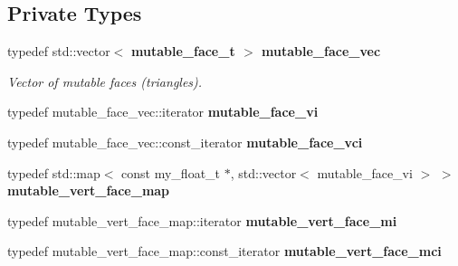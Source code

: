 \subsection*{Private Types}
\begin{CompactItemize}
\item 
typedef std::vector$<$ \bf{mutable\_\-face\_\-t} $>$ \bf{mutable\_\-face\_\-vec}\label{classSimSite3D_1_1geometry_1_1SimpleTrimeshTwo_820d124a6a7b91ebcec829990f741e39}

\begin{CompactList}\small\item\em Vector of mutable faces (triangles). \item\end{CompactList}\item 
typedef mutable\_\-face\_\-vec::iterator \textbf{mutable\_\-face\_\-vi}\label{classSimSite3D_1_1geometry_1_1SimpleTrimeshTwo_67e69e3a888c0c160c3f6ce71a68244d}

\item 
typedef mutable\_\-face\_\-vec::const\_\-iterator \textbf{mutable\_\-face\_\-vci}\label{classSimSite3D_1_1geometry_1_1SimpleTrimeshTwo_3940973197f37f724d808e3d50a24058}

\item 
typedef std::map$<$ const my\_\-float\_\-t $\ast$, std::vector$<$ mutable\_\-face\_\-vi $>$ $>$ \textbf{mutable\_\-vert\_\-face\_\-map}\label{classSimSite3D_1_1geometry_1_1SimpleTrimeshTwo_27881edcabffbac65061128ca312d097}

\item 
typedef mutable\_\-vert\_\-face\_\-map::iterator \textbf{mutable\_\-vert\_\-face\_\-mi}\label{classSimSite3D_1_1geometry_1_1SimpleTrimeshTwo_0d3a0a32929910b60583da6bd9445f85}

\item 
typedef mutable\_\-vert\_\-face\_\-map::const\_\-iterator \textbf{mutable\_\-vert\_\-face\_\-mci}\label{classSimSite3D_1_1geometry_1_1SimpleTrimeshTwo_1bab1411a23f6ed3b44f498bce0132a4}

\end{CompactItemize}
